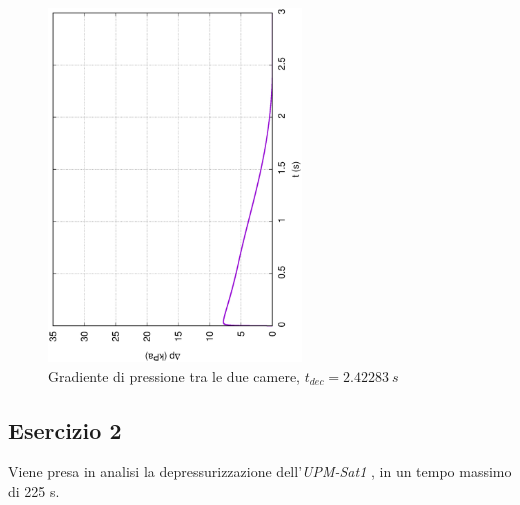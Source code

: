 \documentclass{article}
\begin{document}
        \begin{figure}[h!]
            \centering
            \label{fig:grad_cam_1}
            \includegraphics[width=0.6\textwidth, angle=-90]{MUL2/Esercitazione1/1C/Dp.eps}
            \caption{Gradiente di pressione tra le due camere, $t_{dec} = 2.42283 \ s$}
        \end{figure}
        \clearpage

        \subsection{Esercizio 2\label{Es2}}

        Viene presa in analisi la depressurizzazione dell'\textit{UPM-Sat1} 
        \autocite{UPM_sat1}, in un tempo massimo di 225 s. \\ 
\end{document}
